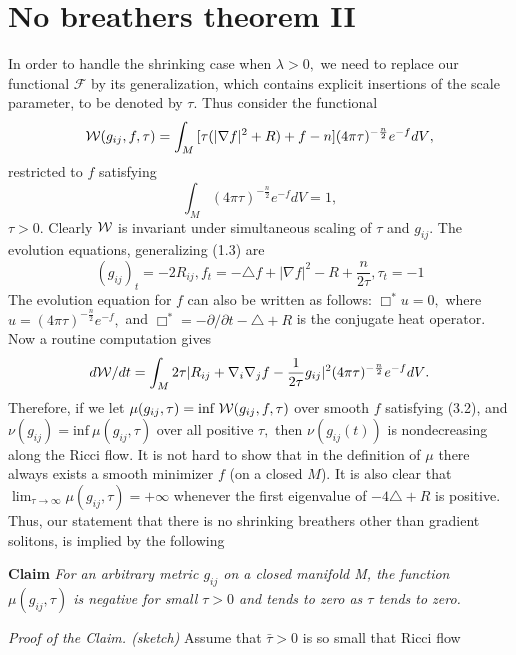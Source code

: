 \documentclass[12pt]{article}
\newcommand{\cW}{{\cal W}}
\newcommand{\cF}{\mathcal {F}}
\theoremstyle{plain}
{\swapnumbers
\newtheorem{thm}{Theorem}[section]
\newtheorem{cor}[thm]{Corollary}
\newtheorem{lem}[thm]{Lemma}
\newtheorem{prop}[thm]{Proposition}
}
\theoremstyle{definition}
{\swapnumbers
\newtheorem{defn}[thm]{Definition}
\newtheorem{nota}[thm]{Notation}
\newtheorem{parag}[thm]{}
\newtheorem*{parstr}{\addtocounter{thm}{1}\thesection.\arabic{thm}*}
\newtheorem*{intropar}{\addtocounter{thm}{1}\arabic{thm}}
}
\theoremstyle{remark} {\swapnumbers
\newtheorem{rem}[thm]{Remark}
\newtheorem{exam}[thm]{Example}
\newtheorem{lemma}[thm]{Lemma}
\newtheorem{claim}[thm]{Claim}
}
\numberwithin{equation}{section}
\begin{document}
\section{ No breathers theorem II}
\begin{parag}
\par  In order to handle the shrinking case when $\lambda>0,$
we need to replace our functional $\cF$ by its generalization,
which contains explicit insertions of the scale parameter, to be
denoted by $\tau.$ Thus consider the functional \begin{equation}
\cW(g_{ij},f,\tau)=\int_M{[\tau(|\nabla
f|^2+R)+f-n](4\pi\tau)^{-\frac{n}{2}}e^{-f}dV},\end{equation}
restricted to $f$ satisfying \begin{equation}
\int_M{(4\pi\tau)^{-\frac{n}{2}}e^{-f}dV}=1,\end{equation}
$\tau>0.$ Clearly $\cW$ is invariant under simultaneous scaling of
$\tau$ and $g_{ij}.$ The evolution equations, generalizing (1.3)
are \begin{equation} (g_{ij})_t=-2R_{ij} , f_t=-\triangle
f+|\nabla f|^2-R+\frac{n}{2\tau} , \tau_t=-1 \end{equation} The
evolution equation for $f$ can also be written as follows:
$\Box^*u=0,$ where $u=(4\pi\tau)^{-\frac{n}{2}}e^{-f},$ and
$\Box^*=-\partial/\partial t -\triangle +R$ is the conjugate heat
operator. Now a routine computation gives \begin{equation}
d\cW/dt=\int_M{2\tau|R_{ij}+\nabla_i\nabla_j
f-\frac{1}{2\tau}g_{ij}|^2(4\pi\tau)^{-\frac{n}{2}}e^{-f}dV}
.\end{equation} Therefore, if we let $\mu(g_{ij},\tau)=\mbox{inf}\
\cW(g_{ij},f,\tau)$ over smooth $f$ satisfying (3.2), and
$\nu(g_{ij})=\mbox{inf}\  \mu(g_{ij},\tau) $ over all positive
$\tau,$ then $\nu(g_{ij}(t))$ is nondecreasing along the Ricci
flow. It is not hard to show that in the definition of $\mu$ there
always exists a smooth minimizer $f$ (on a closed $M$). It is also
clear that $\lim_{\tau\to\infty}\mu(g_{ij},\tau)=+\infty$ whenever
the first eigenvalue of $-4\triangle +R$ is positive. Thus, our
statement that there is no shrinking breathers other than gradient
solitons, is implied by the following \par {\bf Claim} {\it  For
an arbitrary metric $g_{ij}$ on a closed manifold M, the function
$\mu(g_{ij},\tau)$ is negative for small $\tau>0$ and tends to
zero as $\tau$ tends to zero.} \par {\it Proof of the Claim.
(sketch)} Assume that $\bar{\tau}>0$ is so small that Ricci flow

\end{parag}
\end{document}
